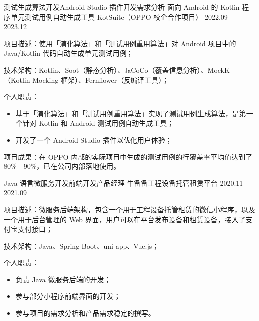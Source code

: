 \begin{cventries}
  \cventry
    {测试生成算法开发{\enskip\cdotp\enskip}Android Studio 插件开发{\enskip\cdotp\enskip}需求分析} %
    {面向 Android 的 Kotlin 程序单元测试用例自动生成工具 KotSuite（OPPO 校企合作项目）} %
    {2022.09 - 2023.12} %
    {} %
    {
      \begin{cvitems} %
        \item {项目描述：使用「演化算法」和「测试用例重用算法」对 Android 项目中的 Java/Kotlin 代码自动生成单元测试用例；}
        \item {技术架构：Kotlin、Soot（静态分析）、JaCoCo（覆盖信息分析）、MockK（Kotlin Mocking 框架）、Fernflower（反编译工具）；}
        \item {个人职责：}
          \begin{itemize}
            \item {基于「演化算法」和「测试用例重用算法」实现了测试用例生成算法，是第一个针对 Kotlin 和 Android 测试用例自动生成工具；}
            \item {开发了一个 Android Studio 插件以优化用户体验；}
          \end{itemize}
        \item {项目成果：在 OPPO 内部的实际项目中生成的测试用例的行覆盖率平均值达到了 80\% - 90\%，已在公司内部落地使用。}
      \end{cvitems}
    }

  \cventry
    {Java 语言微服务开发{\enskip\cdotp\enskip}前端开发{\enskip\cdotp\enskip}产品经理} %
    {牛备备工程设备托管租赁平台} %
    {2020.11 - 2021.09} %
    {} %
    {
      \begin{cvitems}
        \item {项目描述：微服务后端架构，包含一个用于工程设备托管租赁的微信小程序，以及一个用于后台管理的 Web 界面，用户可以在平台发布设备和租赁设备，接入了支付宝支付接口；}
        \item {技术架构：Java、Spring Boot、uni-app、Vue.js；}
        \item {个人职责：}
          \begin{itemize}
            \item {负责 Java 微服务后端的开发；}
            \item {参与部分小程序前端界面的开发；}
            \item {参与项目的需求分析和产品需求稳定的撰写。}
          \end{itemize}
      \end{cvitems}
    }


\end{cventries}
